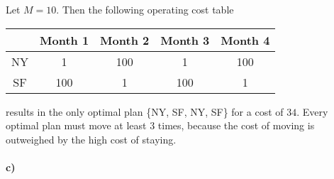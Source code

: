 \documentclass[12pt]{article}
\begin{document}
Let \(M=10\). Then the following operating cost table
\begin{center}
        \begin{tabular}{c | c c c c}
                & Month 1 & Month 2 & Month 3 & Month 4\\
                \hline
                NY & 1 & 100 & 1 & 100\\
                SF & 100 & 1 & 100 & 1 \\
        \end{tabular}
\end{center}
results in the only optimal plan \{NY, SF, NY, SF\} for a cost of \(34\). Every optimal plan must move at least
\(3\) times, because the cost of moving is outweighed by the high cost of staying.

\paragraph{c)}
\end{document}
